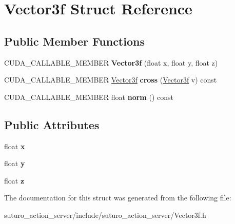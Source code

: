 \hypertarget{structVector3f}{\section{Vector3f Struct Reference}
\label{structVector3f}
}
\subsection*{Public Member Functions}
\begin{DoxyCompactItemize}
\item 
\hypertarget{structVector3f_a727fefc00986bbca1f0493d6731d4064}{C\-U\-D\-A\-\_\-\-C\-A\-L\-L\-A\-B\-L\-E\-\_\-\-M\-E\-M\-B\-E\-R {\bfseries Vector3f} (float x, float y, float z)}\label{structVector3f_a727fefc00986bbca1f0493d6731d4064}

\item 
\hypertarget{structVector3f_a9048708044970abfaedd9d3659434371}{C\-U\-D\-A\-\_\-\-C\-A\-L\-L\-A\-B\-L\-E\-\_\-\-M\-E\-M\-B\-E\-R \hyperlink{structVector3f}{Vector3f} {\bfseries cross} (\hyperlink{structVector3f}{Vector3f} v) const }\label{structVector3f_a9048708044970abfaedd9d3659434371}

\item 
\hypertarget{structVector3f_ab781ea4785ff76b1d942dc2dff32d87e}{C\-U\-D\-A\-\_\-\-C\-A\-L\-L\-A\-B\-L\-E\-\_\-\-M\-E\-M\-B\-E\-R float {\bfseries norm} () const }\label{structVector3f_ab781ea4785ff76b1d942dc2dff32d87e}

\end{DoxyCompactItemize}
\subsection*{Public Attributes}
\begin{DoxyCompactItemize}
\item 
\hypertarget{structVector3f_a4aca0751716b7099b397e8c63b16bfcf}{float {\bfseries x}}\label{structVector3f_a4aca0751716b7099b397e8c63b16bfcf}

\item 
\hypertarget{structVector3f_a8a602e2ee75126feb520c2aa27e7eff5}{float {\bfseries y}}\label{structVector3f_a8a602e2ee75126feb520c2aa27e7eff5}

\item 
\hypertarget{structVector3f_a470cff51eb6463672be518f5af4e26db}{float {\bfseries z}}\label{structVector3f_a470cff51eb6463672be518f5af4e26db}

\end{DoxyCompactItemize}


The documentation for this struct was generated from the following file\-:\begin{DoxyCompactItemize}
\item 
suturo\-\_\-action\-\_\-server/include/suturo\-\_\-action\-\_\-server/Vector3f.\-h\end{DoxyCompactItemize}
